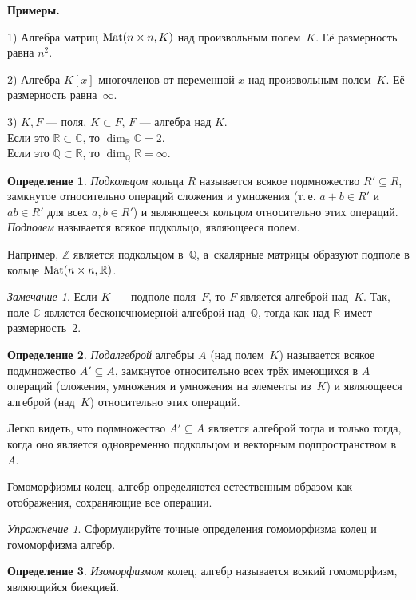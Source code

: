 \documentclass[a4paper, 12pt]{article}
\def\Mat{{\rm Mat}}%
\def\CC{{\mathbb C}}%
\def\ZZ{{\mathbb Z}}%
\def\RR{{\mathbb R}}%
\def\QQ{{\mathbb Q}}%
\def\Mat{{\rm Mat}}
\theoremstyle{definition}
\newtheorem{definition}{Определение}
\theoremstyle{remark}
\newtheorem{exercise}{Упражнение}
\newtheorem{remark}{Замечание}
\begin{document}
\textbf{Примеры.}

1) Алгебра матриц $\Mat(n\times n, K)$ над
произвольным полем~$K$. Её размерность равна $n^2$.

2) Алгебра $K[x]$ многочленов от переменной $x$ над произвольным
полем~$K$. Её размерность равна~$\infty$.

3) $K, F$ --- поля, $K \subset F$, $F$ --- алгебра над $K$. \\
Если это $\RR \subset \CC$, то $\dim_\RR\CC = 2$.\\
Если это $\QQ \subset \RR$, то $\dim_\QQ\RR = \infty$.

\begin{definition}
\textit{Подкольцом} кольца $R$ называется всякое подмножество $R'
\subseteq R$, замкнутое относительно операций сложения и умножения
(т.\,е. $a + b \in R'$ и $ab \in R'$ для всех $a,b \in R'$) и
являющееся кольцом относительно этих операций. \textit{Подполем}
называется всякое подкольцо, являющееся полем.
\end{definition}

Например, $\ZZ$ является подкольцом в~$\QQ$, а~скалярные матрицы
образуют подполе в кольце $\Mat(n \times n, \RR)$.

\begin{remark}
Если $K$~--- подполе поля~$F$, то $F$ является алгеброй над~$K$.
Так, поле $\CC$ является бесконечномерной алгеброй над~$\QQ$, тогда
как над $\RR$ имеет размерность~$2$.
\end{remark}

\begin{definition}
\textit{Подалгеброй} алгебры $A$ (над полем~$K$) называется всякое
подмножество $A' \subseteq A$, замкнутое относительно всех трёх
имеющихся в $A$ операций (сложения, умножения и умножения на
элементы из~$K$) и являющееся алгеброй (над~$K$) относительно этих
операций.
\end{definition}

Легко видеть, что подмножество $A' \subseteq A$ является алгеброй
тогда и только тогда, когда оно является одновременно подкольцом и
векторным подпространством в~$A$.

Гомоморфизмы колец, алгебр определяются естественным образом как
отображения, сохраняющие все операции.

\begin{exercise}
Сформулируйте точные определения гомоморфизма колец и гомоморфизма
алгебр.
\end{exercise}

\begin{definition}
\textit{Изоморфизмом} колец, алгебр называется всякий гомоморфизм,
являющийся биекцией.
\end{definition}
\end{document}
